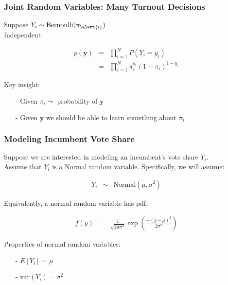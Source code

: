 \documentclass{beamer}
\begin{document}
\begin{frame}
\frametitle{Joint Random Variables: Many Turnout Decisions}
Suppose $Y_{i} \sim \text{Bernoulli}(\pi_{\alert{i}})$ \\
\alert{Independent}

\begin{eqnarray}
p(\boldsymbol{y}) & = & \prod_{i=1}^{N} P(Y_{i} = y_{i})\nonumber \\
				  & = & \prod_{i=1}^{N} \pi_{i} ^{y_{i} } (1- \pi_{i} )^{1- y_{i} } \nonumber
\end{eqnarray}


Key insight:
\begin{itemize}
\item[-] Given $\pi_{i} \leadsto$ probability of $\boldsymbol{y}$ \\
\item[-] Given $\boldsymbol{y}$ we should be able to learn something about $\pi_{i}$
\end{itemize}

\end{frame}

\begin{frame}
\frametitle{Modeling Incumbent Vote Share}


Suppose we are interested in modeling an incumbent's vote share $Y_{i}$.\\
Assume that $Y_{i}$ is a \alert{Normal} random variable.  Specifically, we will assume:

\begin{eqnarray}
Y_{i} & \sim &  \text{Normal}(\mu, \sigma^{2}) \nonumber
\end{eqnarray}

Equivalently, a normal random variable has \alert{pdf}:


\begin{eqnarray}
f(y) & = & \frac{1}{\sqrt{2 \pi \sigma^2}  } \exp\left( \frac{ - (y - \mu )^ 2 }{2\sigma^2}\right)\nonumber
\end{eqnarray}


Properties of normal random variables:
\begin{itemize}
\item[-] $E[Y_{i}] =  \mu $
\item[-] $\text{var}(Y_{i}) = \sigma^2$
\end{itemize}


\end{frame}
\end{document}
